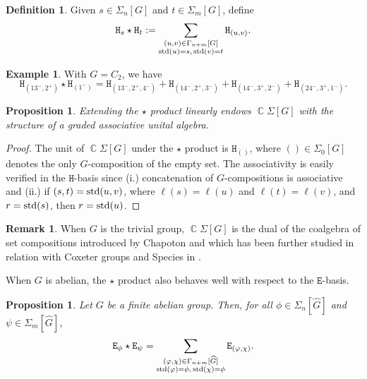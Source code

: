 \documentclass[11pt, oneside, reqno]{amsart}
\newtheorem{prop}[theorem]{Proposition}
\theoremstyle{definition}
\newtheorem{definition}[theorem]{Definition}
\newtheorem{example}[theorem]{Example}
\newtheorem{remark}[theorem]{Remark}
\numberwithin{equation}{section}
\DeclareMathOperator{\C}{\mathbb{C}}
\def \kk{\C}
\def \wh{\widehat}
\def \ztwo {{C_2}}
\newcommand{\B}[1]{\mathtt{#1}} 			%
\begin{document}
\begin{definition}\label{def:staronhsiao}
    Given $s \in \Sigma_n[G]$ and $t \in \Sigma_m[G]$, define
    \[
	\B{H}_s \star \B{H}_t := \sum_{ \substack{ (u,v) \in \Gamma_{n+m}[G] \\ {\rm std}(u)=s,\, {\rm std}(v)=t } } \B{H}_{(u,v)}.
    \]
\end{definition}

\begin{example}
    With $G = \ztwo$, we have
    \[		
        \B{H}_{({13}^-,2^+)} \star \B{H}_{(1^-)} = \B{H}_{(13^-,2^+,4^-)} + \B{H}_{(14^-,2^+,3^-)} + \B{H}_{(14^-,3^+,2^-)} + \B{H}_{(24^-,3^+,1^-)}.
    \]
\end{example}

\begin{prop}
    Extending the $\star$ product linearly endows $\kk \Sigma[G]$ with the structure of a graded associative unital algebra.
\end{prop}

\begin{proof}
    The unit of $\kk \Sigma[G]$ under the $\star$ product is $\B{H}_{()}$, where $() \in \Sigma_0[G]$ denotes the only $G$-composition of the empty set.
    The associativity is easily verified in the $\B{H}$-basis since (i.) concatenation of $G$-compositions is associative and (ii.) if $(s,t) = {\rm std}(u,v)$, where $\ell(s) = \ell(u)$ and $\ell(t) = \ell(v)$, and $r = {\rm std}(s)$, then $r = {\rm std}(u)$.
\end{proof}

\begin{remark}
    When $G$ is the trivial group, $\kk\Sigma[G]$ is the dual of the coalgebra of set compositions introduced by Chapoton \citep{Chapoton00} and which has been further studied in relation with Coxeter groups and Species in \citep{am06,am10}.
\end{remark}

When $G$ is abelian, the $\star$ product also behaves well with respect to the $\B{E}$-basis.

\begin{prop}
    Let $G$ be a finite abelian group. Then, for all $\phi \in \Sigma_n[\wh{G}]$ and $\psi \in \Sigma_m[\wh{G}]$,
    \begin{equation}\label{eq:star-E-basis}
        \B{E}_{\phi} \star \B{E}_{\psi} = \sum_{ \substack{ (\varphi,\chi) \in \Gamma_{n+m}[\wh{G}] \\ {\rm std}(\varphi)=\phi,\, {\rm std}(\chi)=\phi } } 
	\B{E}_{(\varphi,\chi)}.
    \end{equation}
\end{prop}
\end{document}
